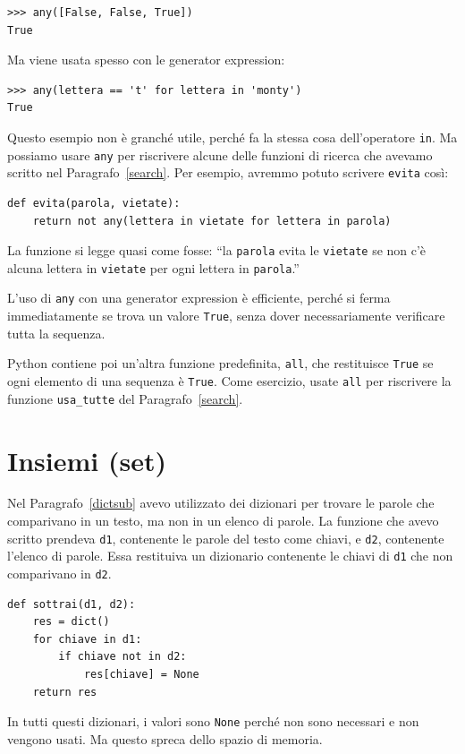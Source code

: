 \documentclass[10pt]{book}
\begin{document}
\begin{verbatim}
>>> any([False, False, True])
True
\end{verbatim}
%
Ma viene usata spesso con le generator expression:

\begin{verbatim}
>>> any(lettera == 't' for lettera in 'monty')
True
\end{verbatim}
%
Questo esempio non è granché utile, perché fa la stessa cosa dell'operatore {\tt in}.  Ma possiamo usare {\tt any} per riscrivere alcune delle funzioni di ricerca che avevamo scritto nel Paragrafo~\ref{search}.  Per esempio, avremmo potuto scrivere {\tt evita} così:

\begin{verbatim}
def evita(parola, vietate):
    return not any(lettera in vietate for lettera in parola)
\end{verbatim}
%
La funzione si legge quasi come fosse: ``la {\tt parola} evita le
{\tt vietate} se non c'è alcuna lettera in {\tt vietate} per ogni lettera in {\tt parola}.''

L'uso di {\tt any} con una generator expression è efficiente, perché si ferma immediatamente se trova un valore {\tt True}, senza dover necessariamente verificare tutta la sequenza. 

Python contiene poi un'altra funzione predefinita, {\tt all}, che restituisce
{\tt True} se ogni elemento di una sequenza è {\tt True}.  Come esercizio, usate {\tt all} per riscrivere la funzione \verb"usa_tutte" del Paragrafo~\ref{search}.


\section{Insiemi (set)}
\label{sets}

Nel Paragrafo~\ref{dictsub} avevo utilizzato dei dizionari per trovare le parole che comparivano in un testo, ma non in un elenco di parole. La funzione che avevo scritto prendeva {\tt d1}, contenente le parole del testo come chiavi, e {\tt d2}, contenente l'elenco di parole. Essa restituiva un dizionario contenente le chiavi di {\tt d1} che non comparivano in {\tt d2}.

\begin{verbatim}
def sottrai(d1, d2):
    res = dict()
    for chiave in d1:
        if chiave not in d2:
            res[chiave] = None
    return res
\end{verbatim}
%
In tutti questi dizionari, i valori sono {\tt None} perché non sono necessari e non vengono usati. Ma questo spreca dello spazio di memoria.
\end{document}
